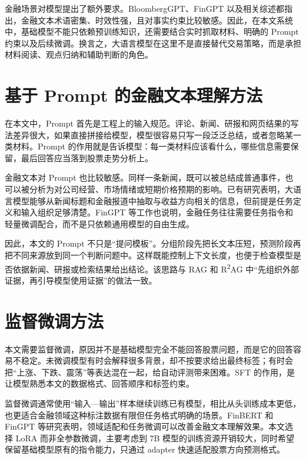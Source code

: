 金融场景对模型提出了额外要求。BloombergGPT、FinGPT 以及相关综述都指出，金融文本术语密集、时效性强，且对事实约束比较敏感\cite{lee2024finllms,li2023llmfinance,nie2024llmfinancialapplications,yang2023fingpt,wu2023bloomberggpt}。因此，在本文系统中，基础模型不能只依赖预训练知识，还需要结合实时抓取材料、明确的 Prompt 约束以及后续微调。换言之，大语言模型在这里不是直接替代交易策略，而是承担材料阅读、观点归纳和辅助判断的角色。

\section{基于 Prompt 的金融文本理解方法}

在本文中，Prompt 首先是工程上的输入规范。评论、新闻、研报和网页结果的写法差异很大，如果直接拼接给模型，模型很容易只写一段泛泛总结，或者忽略某一类材料。Prompt 的作用就是告诉模型：每一类材料应该看什么，哪些信息需要保留，最后回答应当落到股票走势分析上。

金融文本对 Prompt 也比较敏感。同样一条新闻，既可以被总结成普通事件，也可以被分析为对公司经营、市场情绪或短期价格预期的影响。已有研究表明，大语言模型能够从新闻标题和金融报道中抽取与收益方向相关的信息，但前提是任务定义和输入组织足够清楚\cite{lopezlira2023chatgptstock,elahi2024financialnewsllm}。FinGPT 等工作也说明，金融任务往往需要任务指令和轻量微调配合，而不是只依赖通用模型的自由生成\cite{yang2023fingpt}。

因此，本文的 Prompt 不只是“提问模板”。分组阶段先把长文本压短，预测阶段再把不同来源放到同一个判断问题中。这样既能控制上下文长度，也便于检查模型是否依据新闻、研报或检索结果给出结论。该思路与 RAG 和 R\textsuperscript{2}AG 中“先组织外部证据，再引导模型使用证据”的做法一致\cite{lewis2020rag,ye2024r2ag}。

\section{监督微调方法}

本文需要监督微调，原因并不是基础模型完全不能回答股票问题，而是它的回答容易不稳定。未微调模型有时会解释很多背景，却不按要求给出最终标签；有时会把“上涨、下跌、震荡”等表达混在一起，给自动评测带来困难。SFT 的作用，是让模型熟悉本文的数据格式、回答顺序和标签约束。

监督微调通常使用“输入—输出”样本继续训练已有模型，相比从头训练成本更低，也更适合金融领域这种标注数据有限但任务格式明确的场景\cite{yang2023fingpt,ouyang2022instructgpt}。FinBERT 和 FinGPT 等研究表明，领域适配和任务微调可以改善金融文本理解效果\cite{araci2019finbert,yang2023fingpt}。本文选择 LoRA 而非全参数微调，主要考虑到 7B 模型的训练资源开销较大，同时希望保留基础模型原有的指令能力，只通过 adapter 快速适配股票方向预测格式。

